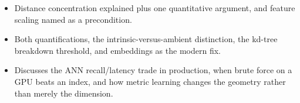 \begin{interviewq}

\goodgreat
\begin{itemize}
    \item {} Distance concentration explained plus one quantitative argument, and feature scaling named as a precondition.
    \item {} Both quantifications, the intrinsic-versus-ambient distinction, the kd-tree breakdown threshold, and embeddings as the modern fix.
    \item {} Discusses the ANN recall/latency trade in production, when brute force on a GPU beats an index, and how metric learning changes the geometry rather than merely the dimension.
\end{itemize}

\end{interviewq}

